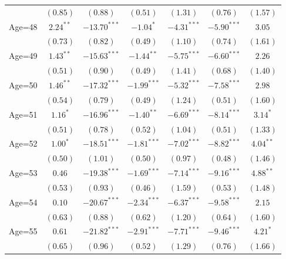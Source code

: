 \documentclass[fullpage]{paper}
\begin{document}
\begin{center}
\begin{longtable}{l c c c c c c }
            & $(0.85)$      & $(0.88)$       & $(0.51)$      & $(1.31)$       & $(0.76)$       & $(1.57)$      \\
Age=48      & $2.24^{**}$   & $-13.70^{***}$ & $-1.04^{*}$   & $-4.31^{***}$  & $-5.90^{***}$  & $3.05$        \\
            & $(0.73)$      & $(0.82)$       & $(0.49)$      & $(1.10)$       & $(0.74)$       & $(1.61)$      \\
Age=49      & $1.43^{**}$   & $-15.63^{***}$ & $-1.44^{**}$  & $-5.75^{***}$  & $-6.60^{***}$  & $2.26$        \\
            & $(0.51)$      & $(0.90)$       & $(0.49)$      & $(1.41)$       & $(0.68)$       & $(1.40)$      \\
Age=50      & $1.46^{**}$   & $-17.32^{***}$ & $-1.99^{***}$ & $-5.32^{***}$  & $-7.58^{***}$  & $2.98$        \\
            & $(0.54)$      & $(0.79)$       & $(0.49)$      & $(1.24)$       & $(0.51)$       & $(1.60)$      \\
Age=51      & $1.16^{*}$    & $-16.96^{***}$ & $-1.40^{**}$  & $-6.69^{***}$  & $-8.14^{***}$  & $3.14^{*}$    \\
            & $(0.51)$      & $(0.78)$       & $(0.52)$      & $(1.04)$       & $(0.51)$       & $(1.33)$      \\
Age=52      & $1.00^{*}$    & $-18.51^{***}$ & $-1.81^{***}$ & $-7.02^{***}$  & $-8.82^{***}$  & $4.04^{**}$   \\
            & $(0.50)$      & $(1.01)$       & $(0.50)$      & $(0.97)$       & $(0.48)$       & $(1.46)$      \\
Age=53      & $0.46$        & $-19.38^{***}$ & $-1.69^{***}$ & $-7.14^{***}$  & $-9.16^{***}$  & $4.88^{**}$   \\
            & $(0.53)$      & $(0.93)$       & $(0.46)$      & $(1.59)$       & $(0.53)$       & $(1.48)$      \\
Age=54      & $0.10$        & $-20.67^{***}$ & $-2.34^{***}$ & $-6.37^{***}$  & $-9.58^{***}$  & $2.15$        \\
            & $(0.63)$      & $(0.88)$       & $(0.62)$      & $(1.20)$       & $(0.64)$       & $(1.60)$      \\
Age=55      & $0.61$        & $-21.82^{***}$ & $-2.91^{***}$ & $-7.71^{***}$  & $-9.46^{***}$  & $4.21^{*}$    \\
            & $(0.65)$      & $(0.96)$       & $(0.52)$      & $(1.29)$       & $(0.76)$       & $(1.66)$      \\

\end{longtable}
\end{center}
\end{document}
